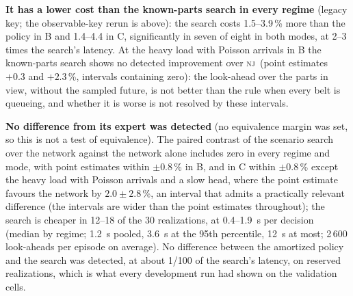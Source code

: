 \documentclass[11pt,a4paper]{article}
\theoremstyle{plain}
\theoremstyle{definition}
\theoremstyle{remark}
\newcommand{\nj}{\textsc{nj}}
\begin{document}
\textbf{It has a lower cost than the known-parts search in every regime} (legacy key; the
observable-key rerun is above): the search costs 1.5--3.9\,\% more than the policy in B and
1.4--4.4 in C, significantly in seven of eight in both modes, at 2--3 times the search's
latency. At the heavy load with Poisson arrivals in B the known-parts search shows no detected
improvement over \nj\ (point estimates $+0.3$ and $+2.3$\,\%, intervals containing zero):
the look-ahead over the parts in view, without the sampled future, is not better than
the rule when every belt is queueing, and whether it is worse is not resolved by these
intervals.

\textbf{No difference from its expert was detected} (no equivalence margin was set, so
this is not a test of equivalence). The paired contrast of the
scenario search over the network against the network alone includes zero in every
regime and mode, with point estimates within $\pm0.8$\,\% in B, and in C within $\pm0.8$\,\% except
the heavy load with Poisson arrivals and a slow head, where the point estimate favours
the network by $2.0\pm2.8$\,\%, an interval that admits a practically relevant difference (the intervals are wider than
the point estimates throughout); the search is cheaper in 12--18 of the 30
realizations, at 0.4--1.9~s per decision
(median by regime; 1.2~s pooled, 3.6~s at the 95th percentile, 12~s at most; 2\,600
look-aheads per episode on average). No difference between the amortized policy and
the search was detected, at about 1/100 of the search's latency, on reserved
realizations, which is what every development run had shown on the validation cells.
\end{document}
